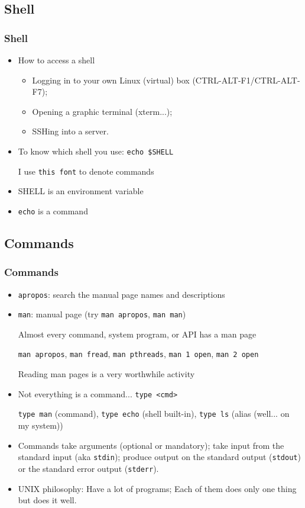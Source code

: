 \documentclass[utf8x,10pt]{beamer}
\begin{document}
\subsection{Shell}
\begin{frame}
  \frametitle{Shell}

  \begin{itemize}
  \item How to access a shell
    \begin{itemize}
    \item Logging in to your own Linux (virtual) box (CTRL-ALT-F1/CTRL-ALT-F7);
    \item Opening a graphic terminal (xterm...);
    \item SSHing into a server.
    \end{itemize}
  \item To know which shell you use: \texttt{echo \$SHELL}

    I use \texttt{this font} to denote commands
  \item SHELL is an environment variable
  \item \texttt{echo} is a command
  \end{itemize}
\end{frame}

\subsection{Commands}
\begin{frame}
  \frametitle{Commands}
  \scriptsize

  \begin{itemize}
  \item \texttt{apropos}: search the manual page names and descriptions
  \item \texttt{man}: manual page (try \texttt{man apropos}, \texttt{man man})
    
    Almost every command, system program, or API has a man page

    \texttt{man apropos}, \texttt{man fread}, \texttt{man pthreads},
    \texttt{man 1 open}, \texttt{man 2 open}

    Reading man pages is a very worthwhile activity

  \item Not everything is a command... \texttt{type <cmd>}
    
    \texttt{type man} (command), \texttt{type echo} (shell built-in),
    \texttt{type ls} (alias (well... on my system))
  \item Commands take arguments (optional or mandatory); take input
    from the standard input (aka \texttt{stdin}); produce output on
    the standard output (\texttt{stdout}) or the standard error output
    (\texttt{stderr}).

    \vfill

  \item UNIX philosophy: Have a lot of programs; Each of them does
    only one thing but does it well.
  \end{itemize}
\end{frame}
\end{document}

